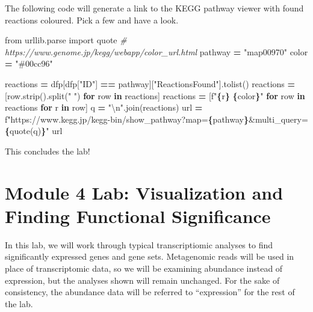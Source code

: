 \documentclass[
]{book}
\newenvironment{Shaded}{\begin{snugshade}}{\end{snugshade}}
\newcommand{\CharTok}[1]{\textcolor[rgb]{0.31,0.60,0.02}{#1}}
\newcommand{\CommentTok}[1]{\textcolor[rgb]{0.56,0.35,0.01}{\textit{#1}}}
\newcommand{\ControlFlowTok}[1]{\textcolor[rgb]{0.13,0.29,0.53}{\textbf{#1}}}
\newcommand{\ImportTok}[1]{#1}
\newcommand{\KeywordTok}[1]{\textcolor[rgb]{0.13,0.29,0.53}{\textbf{#1}}}
\newcommand{\NormalTok}[1]{#1}
\newcommand{\OperatorTok}[1]{\textcolor[rgb]{0.81,0.36,0.00}{\textbf{#1}}}
\newcommand{\SpecialCharTok}[1]{\textcolor[rgb]{0.81,0.36,0.00}{\textbf{#1}}}
\newcommand{\SpecialStringTok}[1]{\textcolor[rgb]{0.31,0.60,0.02}{#1}}
\newcommand{\StringTok}[1]{\textcolor[rgb]{0.31,0.60,0.02}{#1}}
\begin{document}
The following code will generate a link to the KEGG pathway viewer with found reactions coloured.
Pick a few and have a look.

\begin{Shaded}
\begin{Highlighting}[numbers=left,,]
\ImportTok{from}\NormalTok{ urllib.parse }\ImportTok{import}\NormalTok{ quote}
\CommentTok{\# https://www.genome.jp/kegg/webapp/color\_url.html}
\NormalTok{pathway }\OperatorTok{=} \StringTok{"map00970"}
\NormalTok{color }\OperatorTok{=} \StringTok{"\#00cc96"}

\NormalTok{reactions }\OperatorTok{=}\NormalTok{ dfp[dfp[}\StringTok{"ID"}\NormalTok{] }\OperatorTok{==}\NormalTok{ pathway][}\StringTok{"ReactionsFound"}\NormalTok{].tolist()}
\NormalTok{reactions }\OperatorTok{=}\NormalTok{ [row.strip().split(}\StringTok{" "}\NormalTok{) }\ControlFlowTok{for}\NormalTok{ row }\KeywordTok{in}\NormalTok{ reactions]}
\NormalTok{reactions }\OperatorTok{=}\NormalTok{ [}\SpecialStringTok{f"}\SpecialCharTok{\{}\NormalTok{r}\SpecialCharTok{\}}\SpecialStringTok{ }\SpecialCharTok{\{}\NormalTok{color}\SpecialCharTok{\}}\SpecialStringTok{"} \ControlFlowTok{for}\NormalTok{ row }\KeywordTok{in}\NormalTok{ reactions }\ControlFlowTok{for}\NormalTok{ r }\KeywordTok{in}\NormalTok{ row]}
\NormalTok{q }\OperatorTok{=} \StringTok{"}\CharTok{\textbackslash{}n}\StringTok{"}\NormalTok{.join(reactions)}
\NormalTok{url }\OperatorTok{=} \SpecialStringTok{f"https://www.kegg.jp/kegg{-}bin/show\_pathway?map=}\SpecialCharTok{\{}\NormalTok{pathway}\SpecialCharTok{\}}\SpecialStringTok{\&multi\_query=}\SpecialCharTok{\{}\NormalTok{quote(q)}\SpecialCharTok{\}}\SpecialStringTok{"}
\NormalTok{url}
\end{Highlighting}
\end{Shaded}

This concludes the lab!

\chapter{Module 4 Lab: Visualization and Finding Functional Significance}\label{module-4-lab-visualization-and-finding-functional-significance}

In this lab, we will work through typical transcriptiomic analyses to find significantly expressed genes
and gene sets. Metagenomic reads will be used in place of transcriptomic data, so we will be examining
abundance instead of expression, but the analyses shown will remain unchanged.
For the sake of consistency, the abundance data will be referred to ``expression'' for the rest of the lab.
\end{document}
